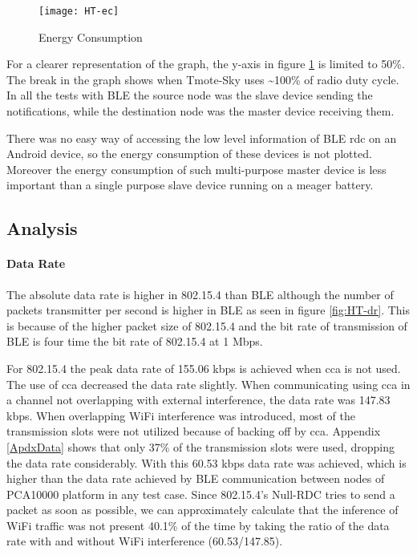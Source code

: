 \begin{figure}[h]
\texttt{[image: HT-ec]}
\caption{Energy Consumption}
\label{fig:HT-ec}
\end{figure}

For a clearer representation of the graph, the y-axis in figure \ref{fig:HT-ec} is limited to 50\%. The break in the graph shows when Tmote-Sky uses \textasciitilde100\% of radio duty cycle. In all the tests with BLE the source node was the slave device sending the notifications, while the destination node was the master device receiving them.

There was no easy way of accessing the low level information of BLE \gls{rdc} on an Android device, so the energy consumption of these devices is not plotted. Moreover the energy consumption of such multi-purpose master device is less important than a single purpose slave device running on a meager battery.

\subsection{Analysis}
\paragraph{Data Rate}
The absolute data rate is higher in 802.15.4 than BLE although the number of packets transmitter per second is higher in BLE as seen in figure \ref{fig:HT-dr}. This is because of the higher packet size of 802.15.4 and the bit rate of transmission of BLE is four time the bit rate of 802.15.4 at 1 Mbps.

For 802.15.4 the peak data rate of 155.06 kbps is achieved when \gls{cca} is not used. The use of \gls{cca} decreased the data rate slightly. When communicating using \gls{cca} in a channel not overlapping with external interference, the data rate was 147.83 kbps. When overlapping WiFi interference was introduced, most of the transmission slots were not utilized because of backing off by \gls{cca}. Appendix \ref{ApdxData} shows that only 37\% of the transmission slots were used, dropping the data rate considerably. With this 60.53 kbps data rate was achieved, which is higher than the data rate achieved by BLE communication between nodes of PCA10000 platform in any test case. Since 802.15.4's Null-RDC tries to send a packet as soon as possible, we can approximately calculate that the inference of WiFi traffic was not present 40.1\% of the time by taking the ratio of the data rate with and without WiFi interference (60.53/147.85). %

